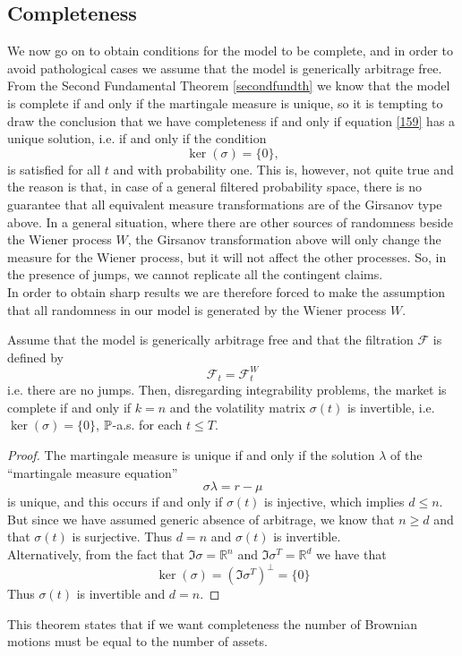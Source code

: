 \subsection{Completeness}
We now go on to obtain conditions for the model to be complete, and in order to avoid pathological cases we assume that the model is generically arbitrage free. From the Second Fundamental Theorem \ref{secondfundth} we know that the model is complete if and only if the martingale measure is unique, so it is tempting to draw the conclusion that we have completeness if and only if equation \eqref{159} has a unique solution, i.e. if and only if the condition
\begin{equation}
    \ker(\sigma) = \{0\},
\end{equation}
is satisfied for all $t$ and with probability one. This is, however, not quite true and the reason is that, in case of a general filtered probability space, there is no guarantee that all equivalent measure transformations are of the Girsanov type above. In a general situation, where there are other sources of randomness beside the Wiener process $W$, the Girsanov transformation above will only change the measure for the Wiener process, but it will not affect the other processes. So, in the presence of jumps, we cannot replicate all the contingent claims.\\
In order to obtain sharp results we are therefore forced to make the assumption that all randomness in our model is generated by the Wiener process $W$. 
\begin{theorem}
    Assume that the model is generically arbitrage free and that the filtration $\mathcal{F}$ is defined by
    \begin{equation}
        \mathcal{F}_t = \mathcal{F}_t^W
    \end{equation}
    i.e. there are no jumps. Then, disregarding integrability problems, the market is complete if and only if $k = n$ and the volatility matrix $\sigma(t)$ is invertible, i.e. $\ker(\sigma) = \{0\}$, $\mathbb{P}$-a.s. for each $t\le T$.
\end{theorem}
\begin{proof}
    The martingale measure is unique if and only if the solution $\lambda$ of the “martingale measure equation” 
    \begin{equation*}
        \sigma\lambda=r-\mu
    \end{equation*}
    is unique, and this occurs if and only if $\sigma(t)$ is injective, which implies $d \le n$. But since we have assumed generic absence of arbitrage, we know that $n \ge d$ and that $\sigma(t)$ is surjective. Thus $d = n$ and $\sigma(t)$ is invertible. \\
    Alternatively, from the fact that $\Im{\sigma}=\mathbb{R}^n$ and $\Im{\sigma^T}=\mathbb{R}^d$ we have that
    \begin{equation*}
        \ker(\sigma) = (\Im{\sigma^T})^{\perp} = \{0\}
    \end{equation*}
    Thus $\sigma(t)$ is invertible and $d = n$.
\end{proof}
This theorem states that if we want completeness the number of Brownian motions must be equal to the number of assets. 

